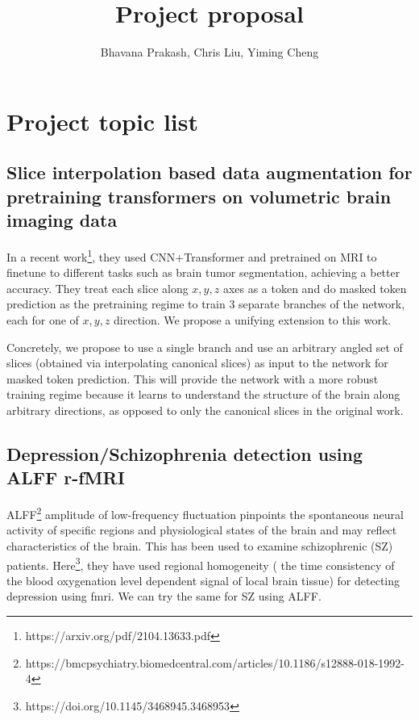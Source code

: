 \documentclass{article}
\title{Project proposal}
\author{Bhavana Prakash, Chris Liu, Yiming Cheng}
\theoremstyle{mytheoremstyle}
\theoremstyle{mytheoremstyle}
\theoremstyle{myproblemstyle}
\begin{document}
    \maketitle

\section{Project topic list}
\subsection{Slice interpolation based data augmentation for pretraining transformers on volumetric brain imaging data}

In a recent work\footnote{https://arxiv.org/pdf/2104.13633.pdf}, they used CNN+Transformer and 
pretrained on MRI to finetune to different tasks such as brain tumor segmentation, achieving a better 
accuracy. They treat each slice along $x,y,z$ axes as a token and do masked token prediction as 
the pretraining regime to train 3 separate branches of the network, each for one of $x,y,z$ direction.
We propose a unifying extension to this work.

Concretely, we propose to use a single branch and use an arbitrary angled set of slices (obtained via 
interpolating canonical slices) as input to the network for masked token prediction. This will provide 
the network with a more robust training regime because it learns to understand the structure of the brain
along arbitrary directions, as opposed to only the canonical slices in the original work.

\subsection{Depression/Schizophrenia detection using ALFF r-fMRI}
ALFF\footnote{https://bmcpsychiatry.biomedcentral.com/articles/10.1186/s12888-018-1992-4}
amplitude of low-frequency fluctuation pinpoints the spontaneous neural 
activity of specific regions and physiological states of the brain and may reflect
 characteristics of the brain. This has been used to examine schizophrenic (SZ) 
 patients. Here\footnote{https://doi.org/10.1145/3468945.3468953}, they have used 
 regional homogeneity ( the time consistency of the blood oxygenation 
 level dependent signal of local brain tissue) for detecting
  depression using fmri. We can try the same for SZ using ALFF.
\end{document}

